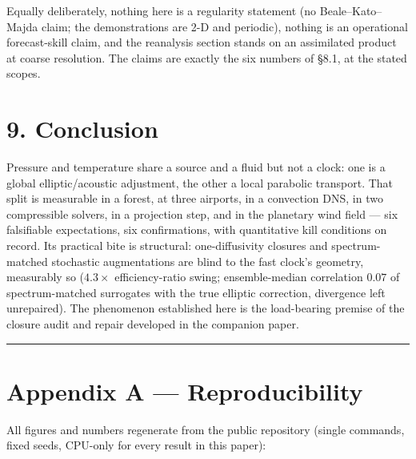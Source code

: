 \documentclass[aps,prfluids,preprint,superscriptaddress,nofootinbib]{revtex4-2}
\begin{document}
Equally deliberately, nothing here is a regularity statement (no Beale--Kato--Majda claim; the demonstrations are 2-D and periodic), nothing is an operational forecast-skill claim, and the reanalysis section stands on an assimilated product at coarse resolution. The claims are exactly the six numbers of \S8.1, at the stated scopes.

\section*{9. Conclusion}

Pressure and temperature share a source and a fluid but not a clock: one is a global elliptic/acoustic adjustment, the other a local parabolic transport. That split is measurable in a forest, at three airports, in a convection DNS, in two compressible solvers, in a projection step, and in the planetary wind field --- six falsifiable expectations, six confirmations, with quantitative kill conditions on record. Its practical bite is structural: one-diffusivity closures and spectrum-matched stochastic augmentations are blind to the fast clock's geometry, measurably so ($4.3\times$ efficiency-ratio swing; ensemble-median correlation $0.07$ of spectrum-matched surrogates with the true elliptic correction, divergence left unrepaired). The phenomenon established here is the load-bearing premise of the closure audit and repair developed in the companion paper.

\medskip\hrule\medskip

\section*{Appendix A --- Reproducibility}

All figures and numbers regenerate from the public repository (single commands, fixed seeds, CPU-only for every result in this paper):
\end{document}
